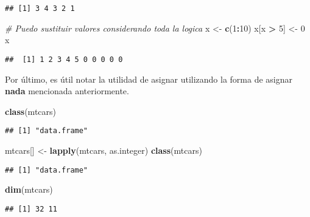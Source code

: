 \documentclass[]{article}
\newenvironment{Shaded}{\begin{snugshade}}{\end{snugshade}}
\newcommand{\KeywordTok}[1]{\textcolor[rgb]{0.13,0.29,0.53}{\textbf{#1}}}
\newcommand{\DecValTok}[1]{\textcolor[rgb]{0.00,0.00,0.81}{#1}}
\newcommand{\StringTok}[1]{\textcolor[rgb]{0.31,0.60,0.02}{#1}}
\newcommand{\CommentTok}[1]{\textcolor[rgb]{0.56,0.35,0.01}{\textit{#1}}}
\newcommand{\OperatorTok}[1]{\textcolor[rgb]{0.81,0.36,0.00}{\textbf{#1}}}
\newcommand{\NormalTok}[1]{#1}
\begin{document}
\begin{verbatim}
## [1] 3 4 3 2 1
\end{verbatim}

\begin{Shaded}
\begin{Highlighting}[]
\CommentTok{# Puedo sustituir valores considerando toda la logica }
\NormalTok{x <-}\StringTok{ }\KeywordTok{c}\NormalTok{(}\DecValTok{1}\OperatorTok{:}\DecValTok{10}\NormalTok{)}
\NormalTok{x[x }\OperatorTok{>}\StringTok{ }\DecValTok{5}\NormalTok{] <-}\StringTok{ }\DecValTok{0}
\NormalTok{x}
\end{Highlighting}
\end{Shaded}

\begin{verbatim}
##  [1] 1 2 3 4 5 0 0 0 0 0
\end{verbatim}

Por último, es útil notar la utilidad de asignar utilizando la forma de
asignar \textbf{nada} mencionada anteriormente.

\begin{Shaded}
\begin{Highlighting}[]
\KeywordTok{class}\NormalTok{(mtcars)}
\end{Highlighting}
\end{Shaded}

\begin{verbatim}
## [1] "data.frame"
\end{verbatim}

\begin{Shaded}
\begin{Highlighting}[]
\NormalTok{mtcars[] <-}\StringTok{ }\KeywordTok{lapply}\NormalTok{(mtcars, as.integer)}
\KeywordTok{class}\NormalTok{(mtcars)}
\end{Highlighting}
\end{Shaded}

\begin{verbatim}
## [1] "data.frame"
\end{verbatim}

\begin{Shaded}
\begin{Highlighting}[]
\KeywordTok{dim}\NormalTok{(mtcars)}
\end{Highlighting}
\end{Shaded}

\begin{verbatim}
## [1] 32 11
\end{verbatim}
\end{document}
